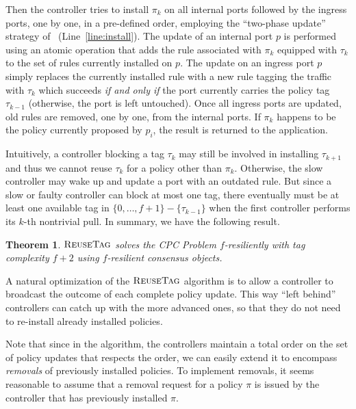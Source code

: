 \documentclass[11pt,pdftex,letter]{article}
\newcommand{\DPO}{\textsc{ReuseTag}}
\newcommand{\dom}{\textit{dom}}
\newtheorem{theorem}{Theorem}
\begin{document}
Then the controller tries to install $\pi_k$
  on all internal ports followed by the ingress ports, one by one, in
  a pre-defined order, employing the
``two-phase update'' strategy of~\cite{network-update} (Line~\ref{line:install}).
The update of an internal port $p$ is performed using an atomic operation
that adds the rule associated with $\pi_k$ equipped with $\tau_k$ to the set of
rules currently installed on $p$.
The update on an ingress port $p$ simply replaces the currently
installed rule with a new rule tagging the traffic with $\tau_k$ which succeeds \emph{if and
only if} the port currently carries the policy tag $\tau_{k-1}$
(otherwise, the port is left untouched).
%
Once all ingress ports are updated, old rules are removed, one by
one, from the internal ports.
If $\pi_k$ happens to be the policy currently proposed by $p_i$, the result is returned to the application.

Intuitively, a controller blocking a tag $\tau_k$ may still be involved in
installing $\tau_{k+1}$ and thus we cannot reuse $\tau_k$ for a policy other
than $\pi_k$. Otherwise, the slow controller may wake up and update a
port with an outdated rule.
But since a slow or faulty controller can block at most one tag, there
eventually must be at least one available tag in $\{0,\ldots,f+1\}-\{\tau_{k-1}\}$
when the first controller performs its $k$-th nontrivial pull.
In summary, we have the following result.
\begin{theorem}\label{thm:lin}
$\DPO$ solves the CPC Problem $f$-resiliently with tag complexity
  $f+2$ using $f$-resilient consensus objects.
\end{theorem}
%
A natural optimization of the $\DPO$ algorithm is to allow a
controller to broadcast the outcome of each complete policy
update. This way ``left behind'' controllers can catch up with the more
advanced ones, so that they do not need to re-install already installed policies.

Note that since in the algorithm, the controllers maintain a
total order on the set of policy updates that respects the order, we can easily extend it to encompass \emph{removals} of previously
installed policies.
To implement removals, it seems reasonable to assume that a removal request for a policy
$\pi$ is issued by the controller that has previously installed $\pi$.
\end{document}
